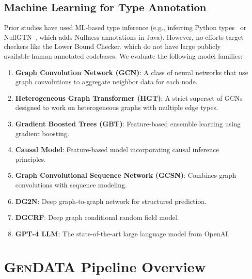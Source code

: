 \documentclass[acmsmall,screen,review,anonymous]{acmart}
\newcommand{\gendata}{\textsc{GenDATA}\xspace}
\begin{document}
\subsection{Machine Learning for Type Annotation}
\label{sec:ml}

Prior studies have used ML-based type inference (e.g., inferring Python types~\cite{cui2021pyinfer,mir2022type4py,peng2023statistical,peng2023generative,wei2023typet5,peng2022static} or NullGTN~\cite{siddiqui2024inferring}, which adds Nullness annotations in Java). However, no efforts target checkers like the Lower Bound Checker, which do not have large publicly available human annotated codebases. We evaluate the following model families:

\begin{enumerate}
    \item \textbf{Graph Convolution Network (GCN)}: A class of neural networks that use graph convolutions to aggregate neighbor data for each node.
    
    \item \textbf{Heterogeneous Graph Transformer (HGT)}: A strict superset of GCNs designed to work on heterogeneous graphs with multiple edge types.
    
    \item \textbf{Gradient Boosted Trees (GBT)}: Feature-based ensemble learning using gradient boosting.
    
    \item \textbf{Causal Model}: Feature-based model incorporating causal inference principles.
    
    \item \textbf{Graph Convolutional Sequence Network (GCSN)}: Combines graph convolutions with sequence modeling.
    
    \item \textbf{DG2N}: Deep graph-to-graph network for structured prediction.
    
    \item \textbf{DGCRF}: Deep graph conditional random field model.
    
    \item \textbf{GPT-4 LLM}: The state-of-the-art large language model from OpenAI.
\end{enumerate}

\section{\gendata Pipeline Overview}
\label{sec:pipeline}
\end{document}
